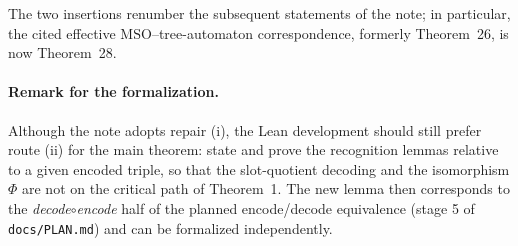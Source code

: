 \documentclass[11pt]{article}
\newcommand{\MSO}{\ensuremath{\mathrm{MSO}}}
\begin{document}
The two insertions renumber the subsequent statements of the note; in
particular, the cited effective \MSO{}--tree-automaton correspondence,
formerly Theorem~26, is now Theorem~28.

\paragraph{Remark for the formalization.} Although the note adopts repair
(i), the Lean development should still prefer route (ii) for the main
theorem: state and prove the recognition lemmas relative to a given encoded
triple, so that the slot-quotient decoding and the isomorphism \(\Phi\) are
not on the critical path of Theorem~1.  The new lemma then corresponds to the
\emph{decode\(\circ\)encode} half of the planned encode/decode equivalence
(stage 5 of \texttt{docs/PLAN.md}) and can be formalized independently.
\end{document}

